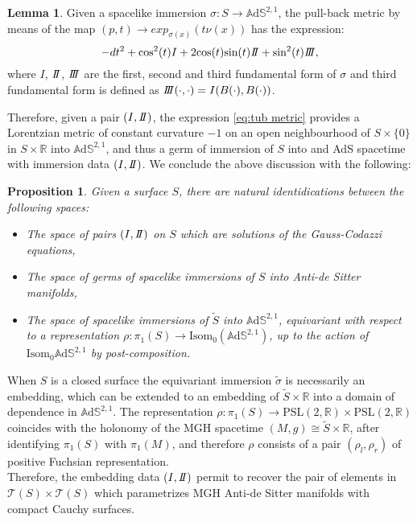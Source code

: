 \documentclass[10pt,a4paper,oneside,reqno]{book}
\def\R{\mathbb{R}}
\def\A{\mathbb{A}\mathrm{d}\mathbb{S}}
\def\PSL{\text{PSL}(2,\R)}
\newcommand{\I}{I}
\newcommand{\II}{I\hspace{-0.1cm}I}
\newcommand{\III}{I\hspace{-0.1cm}I\hspace{-0.1cm}I}
\theoremstyle{plain}
\theoremstyle{definition}
\newtheorem{lemma}[theorem]{Lemma} %
\theoremstyle{plain}
\newtheorem{proposition}[theorem]{Proposition}
\theoremstyle{plain}
\theoremstyle{mystyleNormalFont}
\begin{document}
\begin{lemma}\label{lem:tub metric}
    Given a spacelike immersion $\sigma:S\to \A^{2,1}$, the pull-back metric by means of the map $(p,t) \to exp_{\sigma(x)}(t\nu(x))$ has the expression:
    \begin{equation}\label{eq:tub metric}
        -dt^2 + \text{cos}^2(t)\I + 2\text{cos}(t)\text{sin}(t)\II + \text{sin}^2(t)\III,
    \end{equation}
    where $\I$, $\II$, $\III$ are the first, second and third fundamental form of $\sigma$ and third fundamental form is defined as $\III(\cdot,\cdot)=\I(B(\cdot),B(\cdot))$.
\end{lemma}
Therefore, given a pair $(\I,\II)$, the expression \ref{eq:tub metric} provides a Lorentzian metric of constant curvature $-1$ on an open neighbourhood of $S \times\{0\}$ in $S\times\R$ into $\A^{2,1}$, and thus a germ of immersion of $S$ into and AdS spacetime with immersion data $(\I,\II)$. We conclude the above discussion with the following:
\begin{proposition}\label{thm:immersion data classification}
    Given a surface $S$, there are natural identidications between the following spaces:
    \begin{itemize}
        \item The space of pairs $(\I,\II)$ on $S$ which are solutions of the Gauss-Codazzi equations,
        \item The space of germs of spacelike immersions of $S$ into Anti-de Sitter manifolds,
        \item The space of spacelike immersions of $\widetilde{S}$ into $\A^{2,1}$, equivariant with respect to a representation $\rho:\pi_1(S) \to \text{Isom}_0(\A^{2,1})$, up to the action of $\text{Isom}_0\A^{2,1}$ by post-composition.
    \end{itemize}
\end{proposition}
When $S$ is a closed surface the equivariant immersion $\widetilde{\sigma}$ is necessarily an embedding, which can be extended to an embedding of $\widetilde{S}\times\R$ into a domain of dependence in $\A^{2,1}$. The representation $\rho:\pi_1(S) \to \PSL \times \PSL$ coincides with the holonomy of the MGH spacetime $(M,g) \cong \widetilde{S}\times\R$, after identifying $\pi_1(S)$ with $\pi_1(M)$, and therefore $\rho$ consists of a pair $(\rho_l,\rho_r)$ of positive Fuchsian representation.\\
Therefore, the embedding data $(\I,\II)$ permit to recover the pair of elements in $\mathcal{T}(S)\times\mathcal{T}(S)$ which parametrizes MGH Anti-de Sitter manifolds with compact Cauchy surfaces.
\end{document}
